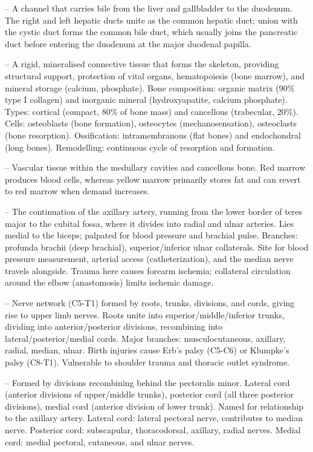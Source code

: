 -- A channel that carries bile from the liver and gallbladder to the duodenum. The right and left hepatic ducts unite as the common hepatic duct; union with the cystic duct forms the common bile duct, which usually joins the pancreatic duct before entering the duodenum at the major duodenal papilla.

-- A rigid, mineralised connective tissue that forms the skeleton, providing structural support, protection of vital organs, hematopoiesis (bone marrow), and mineral storage (calcium, phosphate). Bone composition: organic matrix (90\% type I collagen) and inorganic mineral (hydroxyapatite, calcium phosphate). Types: cortical (compact, 80\% of bone mass) and cancellous (trabecular, 20\%). Cells: osteoblasts (bone formation), osteocytes (mechanosensation), osteoclasts (bone resorption). Ossification: intramembranous (flat bones) and endochondral (long bones). Remodelling: continuous cycle of resorption and formation.

-- Vascular tissue within the medullary cavities and cancellous bone. Red marrow produces blood cells, whereas yellow marrow primarily stores fat and can revert to red marrow when demand increases.

-- The continuation of the axillary artery, running from the lower border of teres major to the cubital fossa, where it divides into radial and ulnar arteries. Lies medial to the biceps; palpated for blood pressure and brachial pulse. Branches: profunda brachii (deep brachial), superior/inferior ulnar collaterals. Site for blood pressure measurement, arterial access (catheterization), and the median nerve travels alongside. Trauma here causes forearm ischemia; collateral circulation around the elbow (anastomosis) limits ischemic damage.

-- Nerve network (C5-T1) formed by roots, trunks, divisions, and cords, giving rise to upper limb nerves. Roots unite into superior/middle/inferior trunks, dividing into anterior/posterior divisions, recombining into lateral/posterior/medial cords. Major branches: musculocutaneous, axillary, radial, median, ulnar. Birth injuries cause Erb's palsy (C5-C6) or Klumpke's palsy (C8-T1). Vulnerable to shoulder trauma and thoracic outlet syndrome.

-- Formed by divisions recombining behind the pectoralis minor. Lateral cord (anterior divisions of upper/middle trunks), posterior cord (all three posterior divisions), medial cord (anterior division of lower trunk). Named for relationship to the axillary artery. Lateral cord: lateral pectoral nerve, contributes to median nerve. Posterior cord: subscapular, thoracodorsal, axillary, radial nerves. Medial cord: medial pectoral, cutaneous, and ulnar nerves.


